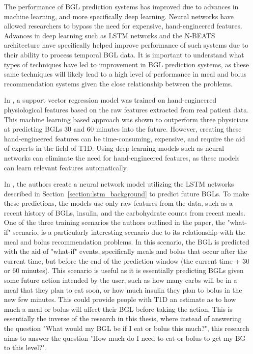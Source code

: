 The performance of \ac{BGL} prediction systems has improved due to advances in machine learning, and more specifically deep learning. Neural networks have allowed researchers to bypass the need for expensive, hand-engineered features. Advances in deep learning such as \ac{LSTM} networks \cite{hochreiter:nc97} and the \ac{N-BEATS} architecture \cite{oreshkin:nbeats} have specifically helped improve performance of such systems due to their ability to process temporal \ac{BGL} data. It is important to understand what types of techniques have led to improvement in \ac{BGL} prediction systems, as these same techniques will likely lead to a high level of performance in meal and bolus recommendation systems given the close relationship between the problems.

In \cite{bunescu:svr_bgl}, a support vector regression model was trained on hand-engineered physiological features based on the raw features extracted from real patient data. This machine learning based approach was shown to outperform three physicians at predicting \ac{BGLs} 30 and 60 minutes into the future. However, creating these hand-engineered features can be time-consuming, expensive, and require the aid of experts in the field of \ac{T1D}. Using deep learning models such as neural networks can eliminate the need for hand-engineered features, as these models can learn relevant features automatically.

In \cite{mirshekarian:bgl_pred}, the authors create a neural network model utilizing the \ac{LSTM} networks described in Section~\ref{section:lstm_background} to predict future \ac{BGLs}. To make these predictions, the models use only raw features from the data, such as a recent history of \ac{BGLs}, insulin, and the carbohydrate counts from recent meals. One of the three training scenarios the authors outlined in the paper, the "what-if" scenario, is a particularly interesting scenario due to its relationship with the meal and bolus recommendation problems. In this scenario, the \ac{BGL} is predicted with the aid of "what-if" events, specifically meals and bolus that occur after the current time, but before the end of the prediction window (the current time + 30 or 60 minutes). 
This scenario is useful as it is essentially predicting \ac{BGLs} given some future action intended by the user, such as how many carbs will be in a meal that they plan to eat soon, or how much insulin they plan to bolus in the new few minutes. This could provide people with \ac{T1D} an estimate as to how much a meal or bolus will affect their \ac{BGL} before taking the action. This is essentially the inverse of the research in this thesis, where instead of answering the question "What would my \ac{BGL} be if I eat or bolus this much?", this research aims to answer the question "How much do I need to eat or bolus to get my \ac{BG} to this level?".

